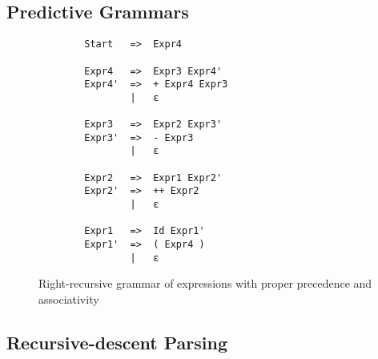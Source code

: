 \documentclass[hidelinks]{uva-inf-article}
\begin{document}
\begin{flushleft}
\subsection{Predictive Grammars}
\begin{figure}[h]
    \begin{lstlisting}
        Start   =>  Expr4

        Expr4   =>  Expr3 Expr4'
        Expr4'  =>  + Expr4 Expr3
                |   ε
        
        Expr3   =>  Expr2 Expr3'
        Expr3'  =>  - Expr3
                |   ε
        
        Expr2   =>  Expr1 Expr2'
        Expr2'  =>  ++ Expr2
                |   ε
        
        Expr1   =>  Id Expr1'
        Expr1'  =>  ( Expr4 )
                |   ε
    \end{lstlisting}
    \caption{Right-recursive grammar of expressions with proper precedence and associativity}
    \label{fig:3}
\end{figure}
\subsection{Recursive-descent Parsing}

\end{flushleft}
\end{document}
